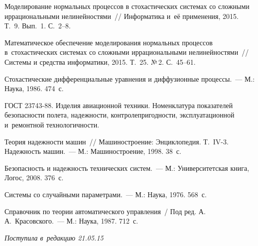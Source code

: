\begin{multicols}{2}
{{\begin{thebibliography}{99}
Моделирование нормальных процессов в стохастических
системах со сложными иррациональными нелинейностями~// Информатика и~её
применения, 2015. Т.~9. Вып.~1. С.~2--8.

Математическое обеспечение моделирования нормальных процессов
в~стохастических системах со сложными иррациональными нелинейностями~//
Системы и средства информатики, 2015. Т.~25. №\,2. С.~45--61.

 Стохастические
дифференциальные уравнения и диффузионные процессы.~--- М.: Наука, 1986.
474~с.

ГОСТ 23743-88. Изделия авиационной техники.
Номенклатура показателей безопасности полета, надежности,
контролепригодности, эксплуатационной и~ремонтной технологичности.


Теория надежности машин~// Машиностроение: Энциклопедия. Т.~IV-3.
Надежность машин.~--- М.: Машиностроение, 1998. 38~с.

 Безопасность и надежность технических сис\-тем.~---
 М.: Университетская книга, Логос, 2008. 376~с.

Системы со случайными параметрами.~--- М.: Наука, 1976. 568~с.

Справочник по теории автоматического управления~/ Под ред. А.\,А.~Красовского.~---
М.: Наука, 1987. 712~с.
 \end{thebibliography}

 }
 }

\end{multicols}

\vspace*{-10pt}

\hfill{\small\textit{Поступила в~редакцию 21.05.15}}

\newpage

\vspace*{-24pt}





